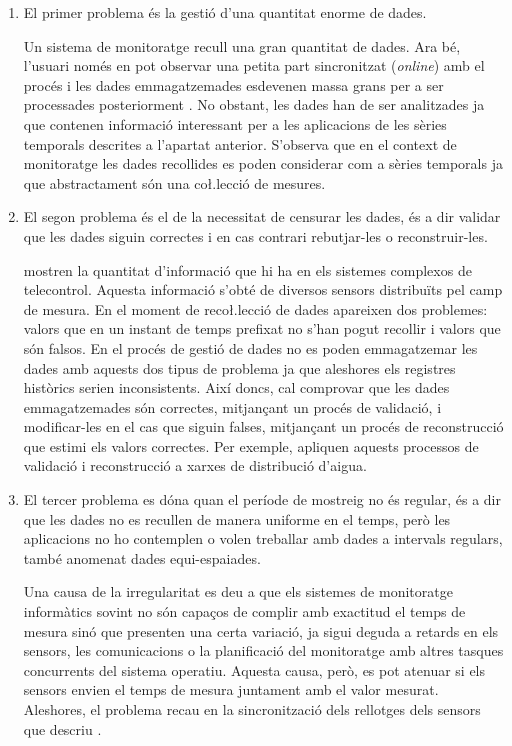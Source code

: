 \begin{enumerate}
\item El primer problema és la gestió d'una quantitat enorme de dades. 

Un sistema de monitoratge recull una gran quantitat de dades. Ara bé, l'usuari només en pot observar una petita part sincronitzat (\emph{online}) amb el procés i les dades emmagatzemades esdevenen massa grans per a ser processades posteriorment \parencite{keogh97}. No obstant, les dades han de ser analitzades ja que contenen informació interessant per a les aplicacions de les sèries temporals descrites a l'apartat anterior. S'observa que en el context de monitoratge les dades recollides es poden considerar com a sèries temporals ja que abstractament són una co\l.lecció de mesures.


\item El segon problema és el de la necessitat de censurar les dades, és a dir validar que les dades siguin correctes i en cas contrari rebutjar-les o reconstruir-les. 

\textcite{quevedo10} mostren la quantitat d'informació que hi ha en els sistemes complexos de telecontrol. Aquesta informació s'obté de diversos sensors distribuïts pel camp de mesura.
En el moment de reco\l.lecció de dades apareixen dos problemes: valors que en un instant de temps prefixat no s'han pogut recollir i valors que són falsos. En el procés de gestió de dades no es poden emmagatzemar les dades amb aquests dos tipus de problema ja que aleshores els registres històrics serien inconsistents. 
Així doncs, cal comprovar que les dades emmagatzemades són correctes, mitjançant un procés de validació, i modificar-les en el cas que siguin falses, mitjançant un procés de reconstrucció que estimi els valors correctes. Per exemple, \citeauthor{quevedo10} apliquen aquests processos de validació i reconstrucció a xarxes de distribució d'aigua.


\item El tercer problema es dóna quan el període de mostreig no és regular, és a dir que les dades no es recullen de manera uniforme en el temps, però les aplicacions no ho contemplen o volen treballar amb dades a intervals regulars, també anomenat dades equi-espaiades.

Una causa de la irregularitat es deu a que els sistemes de monitoratge informàtics sovint no són capaços de complir amb exactitud el temps de mesura sinó que presenten una certa variació, ja sigui deguda a retards en els sensors, les comunicacions o la planificació del monitoratge amb altres tasques concurrents del sistema operatiu. Aquesta causa, però, es pot atenuar si els sensors envien el temps de mesura juntament amb el valor mesurat. Aleshores, el problema recau en la sincronització dels rellotges dels sensors que descriu \textcite[cap.~3]{kopetz11:realtime}.



\end{enumerate}
